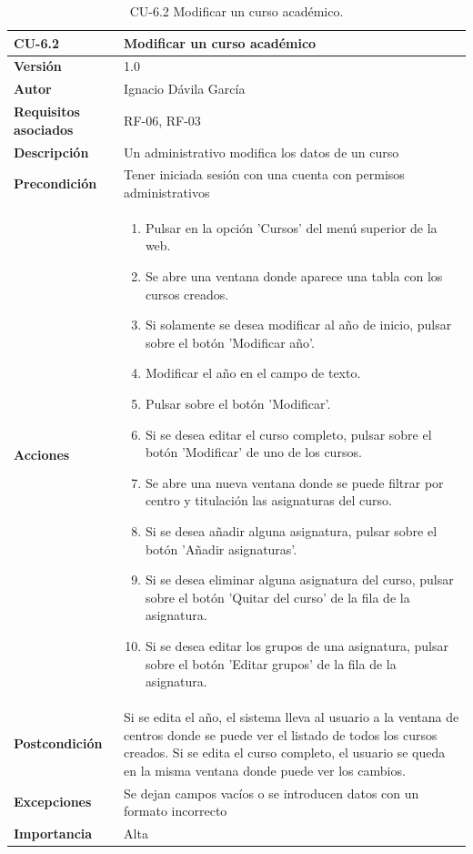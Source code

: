 \begin{table}[p]
	\centering
	\begin{tabularx}{\linewidth}{ p{} p{} }
		\toprule
		\textbf{CU-6.2}    & \textbf{Modificar un curso académico}\\
		\toprule
		\textbf{Versión}              & 1.0    \\
		\textbf{Autor}                & Ignacio Dávila García \\
		\textbf{Requisitos asociados} & RF-06, RF-03 \\
		\textbf{Descripción}          & Un administrativo modifica los datos de un curso \\
		\textbf{Precondición}         & Tener iniciada sesión con una cuenta con permisos administrativos \\
		\textbf{Acciones}             &
		\begin{enumerate}
			\def\labelenumi{\arabic{enumi}.}
			\tightlist
			\item Pulsar en la opción 'Cursos' del menú superior de la web.
			\item Se abre una ventana donde aparece una tabla con los cursos creados.
			\item Si solamente se desea modificar al año de inicio, pulsar sobre el botón 'Modificar año'.
			\item Modificar el año en el campo de texto.
			\item Pulsar sobre el botón 'Modificar'.
			\item Si se desea editar el curso completo, pulsar sobre el botón 'Modificar' de uno de los cursos.
			\item Se abre una nueva ventana donde se puede filtrar por centro y titulación las asignaturas del curso.
			\item Si se desea añadir alguna asignatura, pulsar sobre el botón 'Añadir asignaturas'.
			\item Si se desea eliminar alguna asignatura del curso, pulsar sobre el botón 'Quitar del curso' de la fila de la asignatura.
			\item Si se desea editar los grupos de una asignatura, pulsar sobre el botón 'Editar grupos' de la fila de la asignatura.

		\end{enumerate}\\
		\textbf{Postcondición}        & Si se edita el año, el sistema lleva al usuario a la ventana de centros donde se puede ver el listado de todos los cursos creados. Si se edita el curso completo, el usuario se queda en la misma ventana donde puede ver los cambios. \\
		\textbf{Excepciones}          & Se dejan campos vacíos o se introducen datos con un formato incorrecto \\
		\textbf{Importancia}          & Alta \\
		\bottomrule
	\end{tabularx}
	\caption{CU-6.2 Modificar un curso académico.}
\end{table}

